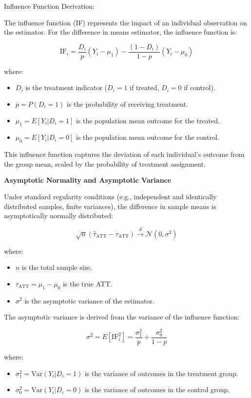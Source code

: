 \documentclass{article}
\begin{document}
Influence Function Derivation:

The influence function (IF) represents the impact of an individual observation on the estimator. For the difference in means estimator, the influence function is:

\[
\text{IF}_i = \frac{D_i}{p} (Y_i - \mu_1) - \frac{(1 - D_i)}{1 - p} (Y_i - \mu_0)
\]

where:

\begin{itemize}
    \item \(D_i\) is the treatment indicator (\(D_i = 1\) if treated, \(D_i = 0\) if control).
    \item \(p = P(D_i = 1)\) is the probability of receiving treatment.
    \item \(\mu_1 = E[Y_i | D_i = 1]\) is the population mean outcome for the treated.
    \item \(\mu_0 = E[Y_i | D_i = 0]\) is the population mean outcome for the control.
\end{itemize}

This influence function captures the deviation of each individual's outcome from the group mean, scaled by the probability of treatment assignment.

\textbf{Asymptotic Normality and Asymptotic Variance}

Under standard regularity conditions (e.g., independent and identically distributed samples, finite variances), the difference in sample means is asymptotically normally distributed:

\[
\sqrt{n} (\hat{\tau}_{\text{ATT}} - \tau_{\text{ATT}}) \xrightarrow{d} \mathcal{N}(0, \sigma^2)
\]

where:

\begin{itemize}
    \item \(n\) is the total sample size.
    \item \(\tau_{\text{ATT}} = \mu_1 - \mu_0\) is the true ATT.
    \item \(\sigma^2\) is the asymptotic variance of the estimator.
\end{itemize}

The asymptotic variance is derived from the variance of the influence function:

\[
\sigma^2 = E[\text{IF}_i^2] = \frac{\sigma_1^2}{p} + \frac{\sigma_0^2}{1 - p}
\]

where:

\begin{itemize}
    \item \(\sigma_1^2 = \text{Var}(Y_i | D_i = 1)\) is the variance of outcomes in the treatment group.
    \item \(\sigma_0^2 = \text{Var}(Y_i | D_i = 0)\) is the variance of outcomes in the control group.
\end{itemize}
\end{document}
